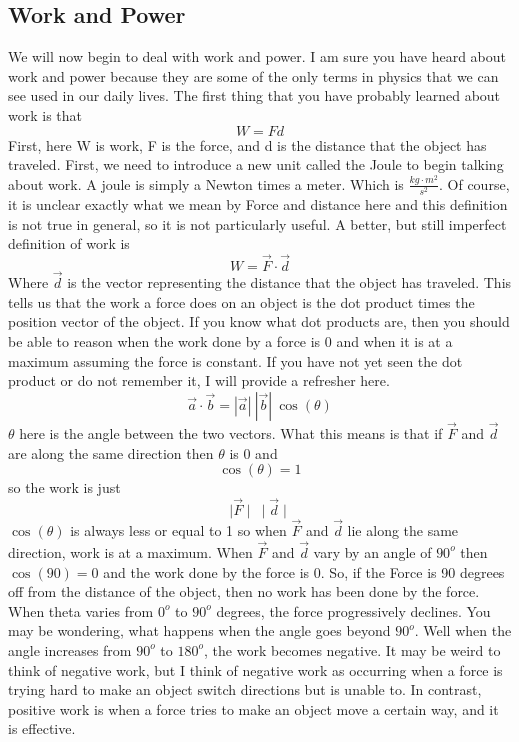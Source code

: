 \documentclass{article}[gray]
\numberwithin{equation}{subsection}
\begin{document}
\subsection{Work and Power}
We will now begin to deal with work and power. I am sure you have heard about work and power because they are some of the only terms in physics that we can see used in our daily lives. The first thing that you have probably learned about work is that \begin{equation}W=Fd\end{equation} First, here W is work, F is the force, and d is the distance that the object has traveled. First, we need to introduce a new unit called the Joule to begin talking about work. A joule is simply a Newton times a meter. Which is $\frac{kg\cdot m^2}{s^2}$. Of course, it is unclear exactly what we mean by Force and distance here and this definition is not true in general, so it is not particularly useful. A better, but still imperfect definition of work is \begin{equation}W=\vec{F} \cdot \vec{d}\end{equation} Where $\vec{d}$ is the vector representing the distance that the object has traveled. This tells us that the work a force does on an object is the dot product times the position vector of the object. If you know what dot products are, then you should be able to reason when the work done by a force is 0 and when it is at a maximum assuming the force is constant. If you have not yet seen the dot product or do not remember it, I will provide a refresher here. $$\vec{a} \cdot \vec{b}=|\vec{a}| \ |\vec{b}| \ \cos\left(\theta \right)$$ $\theta$ here is the angle between the two vectors. What this means is that if $\vec{F}$ and $\vec{d}$ are along the same direction then $\theta$ is 0 and $$\cos\left(\theta \right)=1$$ so the work is just $$\mid \vec{F}\mid \ \mid\vec{d}\mid$$ $\cos\left(\theta \right)$ is always less or equal to 1 so when $\vec{F}$ and $\vec{d}$ lie along the same direction, work is at a maximum. When $\vec{F}$ and $\vec{d}$ vary by an angle of $90^o$ then $\cos\left(90 \right)=0$ and the work done by the force is 0. So, if the Force is 90 degrees off from the distance of the object, then no work has been done by the force. When theta varies from $0^o$ to $90^o$ degrees, the force progressively declines. You may be wondering, what happens when the angle goes beyond $90^o$. Well when the angle increases from $90^o$ to $180^o$, the work becomes negative. It may be weird to think of negative work, but I think of negative work as occurring when a force is trying hard to make an object switch directions but is unable to. In contrast, positive work is when a force tries to make an object move a certain way, and it is effective. 
\end{document}
